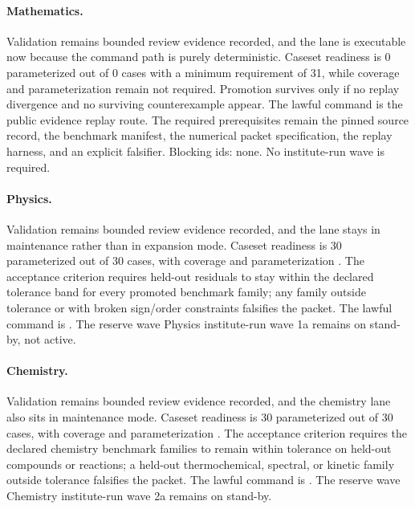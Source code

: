 \paragraph{Mathematics.}
Validation remains bounded review evidence recorded, and the lane is executable now because the
command path is purely deterministic. Caseset readiness is 0 parameterized out
of 0 cases with a minimum requirement of 31, while coverage and parameterization
remain not required. Promotion survives only if no replay divergence
and no surviving counterexample appear. The lawful command is
the public evidence replay route. The
required prerequisites remain the pinned source record, the benchmark manifest,
the numerical packet specification, the replay harness, and an explicit
falsifier. Blocking ids: none. No institute-run wave is required.

\paragraph{Physics.}
Validation remains bounded review evidence recorded, and the lane stays in maintenance rather than
in expansion mode. Caseset readiness is 30 parameterized out of 30 cases, with
coverage  and parameterization
. The acceptance criterion requires
held-out residuals to stay within the declared tolerance band for every
promoted benchmark family; any family outside tolerance or with broken
sign/order constraints falsifies the packet. The lawful command is
. The reserve wave
Physics institute-run wave 1a remains on stand-by, not active.

\paragraph{Chemistry.}
Validation remains bounded review evidence recorded, and the chemistry lane also sits in
maintenance mode. Caseset readiness is 30 parameterized out of 30 cases, with
coverage  and parameterization
. The acceptance criterion requires
the declared chemistry benchmark families to remain within tolerance on
held-out compounds or reactions; a held-out thermochemical, spectral, or
kinetic family outside tolerance falsifies the packet. The lawful command is
. The reserve wave
Chemistry institute-run wave 2a remains on stand-by.


